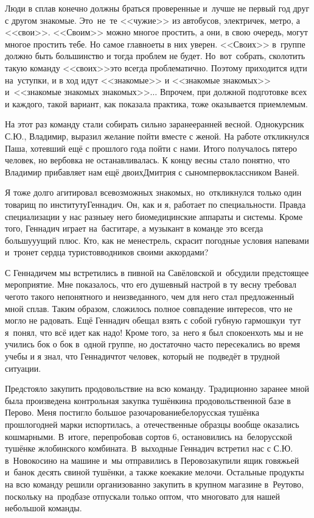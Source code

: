 Люди в сплав конечно должны браться проверенные и~лучше не первый год друг с другом знакомые. Это~не~те <<чужие>> из автобусов, электричек, метро, а <<свои>>. <<Своим>> можно многое простить, а они, в свою очередь, могут многое простить тебе. Но самое главное\mdash ты в них уверен. <<Своих>> в~группе должно быть большинство и тогда проблем не будет. Но~вот~собрать, сколотить такую команду <<своих>>\mdash это всегда проблематично. Поэтому приходится идти на~уступки, и в ход идут <<знакомые>> и <<знакомые знакомых>> и~<<знакомые знакомых знакомых>>$\ldots$ Впрочем, при должной подготовке всех и каждого, такой вариант, как показала практика, тоже оказывается приемлемым.

На этот раз команду стали собирать сильно заранее\mdash ранней весной. Однокурсник С.Ю., Владимир, выразил желание пойти вместе с женой. На работе откликнулся Паша, хотевший ещё с прошлого года пойти с нами. Итого получалось пятеро человек, но вербовка не останавливалась. К концу весны стало понятно, что Владимир прибавляет нам ещё двоих\mdash Дмитрия с сыном\sdash первоклассником Ваней. 

Я тоже долго агитировал всевозможных знакомых, но~откликнулся только один товарищ по институту\mdash Геннадич. Он, как и я, работает по специальности. Правда специализации у нас разные\mdash у него биомедицинские аппараты и системы. Кроме того, Геннадич играет на~бас\sdash гитаре, а музыкант в команде это всегда большу\sdash у\sdash ущий плюс. Кто, как не менестрель, скрасит погодные условия напевами и~тронет сердца туристов\sdash водников своими аккордами?

С Геннадичем мы встретились в пивной на Савёловской и~обсудили предстоящее мероприятие. Мне показалось, что его душевный настрой в ту весну требовал чего\sdash то такого непонятного и неизведанного, чем для него стал предложенный мной сплав. Таким образом, сложилось полное совпадение интересов, что не могло не радовать. Ещё Геннадич обещал взять с собой губную гармошку\mdash и~тут я~понял, что всё идет как надо! Кроме того, за~него я был спокоен\mdash хоть мы и не учились бок о бок в~одной группе, но достаточно часто пересекались во время учебы и я знал, что Геннадич\mdash тот человек, который не~подведёт в трудной ситуации. %

Предстояло закупить продовольствие на всю команду. Традиционно заранее мной была произведена контрольная закупка тушёнки\mdash на продовольственной базе в Перово. Меня постигло большое разочарование\mdash белорусская тушёнка прошлогодней марки испортилась, а~отечественные образцы вообще оказались кошмарными. В~итоге, перепробовав сортов 6\thinspace\nbdash{}, остановились на~белорусской тушёнке жлобинского комбината. В~выходные Геннадич встретил нас с С.Ю. в~Новокосино на машине и~мы отправились в Перово\mdash закупили ящик говяжьей и~банок десять свиной тушёнки, а также кое\sdash какие мелочи. Остальные продукты на всю команду решили организованно закупить в крупном магазине в~Реутово, поскольку на~продбазе отпускали только оптом, что многовато для нашей небольшой команды.  

